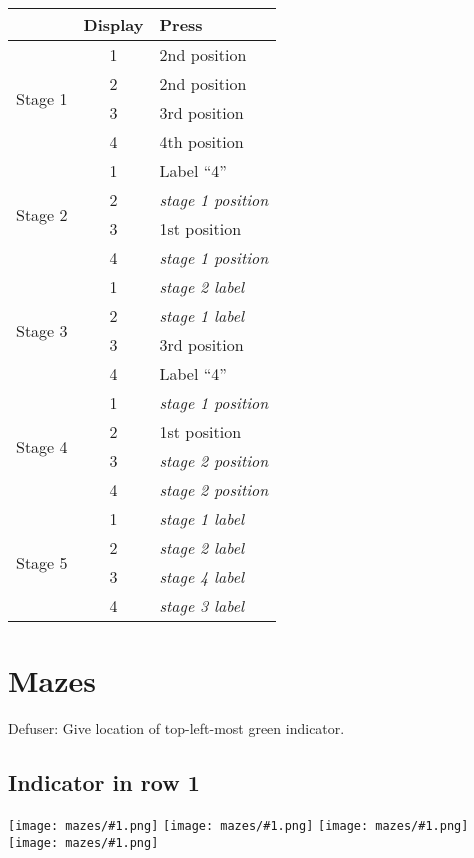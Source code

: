 \documentclass[11pt]{amsart}
\newcommand{\Maze}[1]{\texttt{[image: mazes/\#1.png]}}
\begin{document}
\begin{tabular}{|l|c|l|}
\hline
 & Display & Press \\
\hline
\multirow{4}{*}{Stage 1} & 1 & 2nd position \\
                         & 2 & 2nd position \\
                         & 3 & 3rd position \\
                         & 4 & 4th position \\
\hline
\multirow{4}{*}{Stage 2} & 1 & Label ``4'' \\
                         & 2 & \textit{stage 1 position} \\
                         & 3 & 1st position \\
                         & 4 & \textit{stage 1 position} \\
\hline
\multirow{4}{*}{Stage 3} & 1 & \textit{stage 2 label} \\
                         & 2 & \textit{stage 1 label} \\
                         & 3 & 3rd position \\
                         & 4 & Label ``4'' \\
\hline
\multirow{4}{*}{Stage 4} & 1 & \textit{stage 1 position} \\
                         & 2 & 1st position \\
                         & 3 & \textit{stage 2 position} \\
                         & 4 & \textit{stage 2 position} \\
\hline
\multirow{4}{*}{Stage 5} & 1 & \textit{stage 1 label} \\
                         & 2 & \textit{stage 2 label} \\
                         & 3 & \textit{stage 4 label} \\
                         & 4 & \textit{stage 3 label} \\
\hline
\end{tabular}




\section{Mazes}

Defuser: Give location of top-left-most green indicator.

\subsection{Indicator in row 1}
\Maze{11} \Maze{12} \Maze{14} \Maze{15}
\end{document}

